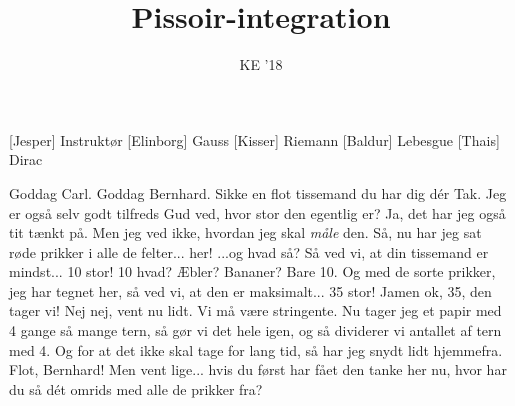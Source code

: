 \documentclass[a4paper,11pt]{article}
\title{Pissoir-integration}
\author{KE '18}
\begin{document}
\maketitle

\begin{roles}
[Jesper] Instruktør
[Elinborg] Gauss
[Kisser] Riemann
[Baldur] Lebesgue
[Thais] Dirac
\end{roles}
\begin{sketch}
 Goddag Carl.
 Goddag Bernhard.
 Sikke en flot tissemand du har dig dér
 Tak. Jeg er også selv godt tilfreds
 Gud ved, hvor stor den egentlig er?
 Ja, det har jeg også tit tænkt på. Men jeg ved ikke, hvordan jeg skal \textit{måle} den.
 Så, nu har jeg sat røde prikker i alle de felter... her!
 ...og hvad så?
 Så ved vi, at din tissemand er mindst... 
 10 stor!
 10 hvad? Æbler? Bananer?
 Bare 10. 
 Og med de sorte prikker, jeg har tegnet her, så ved vi, at den er maksimalt...
 35 stor!
 Jamen ok, 35, den tager vi!
 Nej nej, vent nu lidt. Vi må være stringente. Nu tager jeg et papir med 4 gange så mange tern, så gør vi det hele igen, og så dividerer vi antallet af tern med 4.
 Og for at det ikke skal tage for lang tid, så har jeg snydt lidt hjemmefra.
 Flot, Bernhard! Men vent lige... hvis du først har fået den tanke her nu, hvor har du så dét omrids med alle de prikker fra?

\end{sketch}
\end{document}
